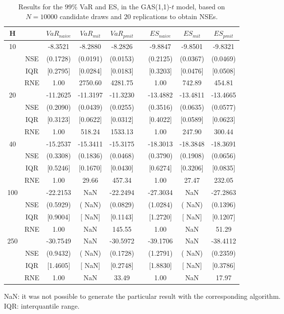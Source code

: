 \begin{table}[h] 
\centering 
\caption{Results for the $99\%$ VaR and ES, in the GAS(1,1)-$t$ model, based on $N=10000$ candidate draws and $20$ replications to obtain NSEs.} 
\label{tab:res_algos_t_gas_ML} 
\begin{tabular}{ccccccccc}  
 H & & $VaR_{naive}$ & $VaR_{mit}$ & $VaR_{pmit}$ &  & $ES_{naive}$ & $ES_{mit}$ & $ES_{pmit}$ \\ \hline 
10 & & -8.3521 & -8.2880 & -8.2826 & & -9.8847 & -9.8501 & -9.8321  \\ 
  & NSE & (0.1728) & (0.0191) & (0.0153) & & (0.2125) & (0.0367) & (0.0469)   \\ 
 & IQR & $[$0.2795$]$ & $[$0.0284$]$ & $[$0.0183$]$ & & $[$0.3203$]$ & $[$0.0476$]$ & $[$0.0508$]$  \\  
  & RNE &   1.00 & 2750.60 & 4281.75 & &   1.00 & 742.89 & 454.81   \\ [1ex] 
20 & & -11.2625 & -11.3197 & -11.3230 & & -13.4882 & -13.4811 & -13.4665  \\ 
  & NSE & (0.2090) & (0.0439) & (0.0255) & & (0.3516) & (0.0635) & (0.0577)   \\ 
 & IQR & $[$0.3123$]$ & $[$0.0622$]$ & $[$0.0312$]$ & & $[$0.4022$]$ & $[$0.0589$]$ & $[$0.0623$]$  \\  
  & RNE &   1.00 & 518.24 & 1533.13 & &   1.00 & 247.90 & 300.44   \\ [1ex] 
40 & & -15.2537 & -15.3411 & -15.3175 & & -18.3013 & -18.3848 & -18.3691  \\ 
  & NSE & (0.3308) & (0.1836) & (0.0468) & & (0.3790) & (0.1908) & (0.0656)   \\ 
 & IQR & $[$0.5246$]$ & $[$0.1670$]$ & $[$0.0430$]$ & & $[$0.6274$]$ & $[$0.3206$]$ & $[$0.0835$]$  \\  
  & RNE &   1.00 &  29.66 & 457.34 & &   1.00 &  27.47 & 232.05   \\ [1ex] 
100 & & -22.2153 &    NaN & -22.2494 & & -27.3034 &    NaN & -27.2863  \\ 
  & NSE & (0.5929) & (   NaN) & (0.0829) & & (1.0284) & (   NaN) & (0.1396)   \\ 
 & IQR & $[$0.9004$]$ & $[$   NaN$]$ & $[$0.1143$]$ & & $[$1.2720$]$ & $[$   NaN$]$ & $[$0.1207$]$  \\  
  & RNE &   1.00 &    NaN & 145.55 & &   1.00 &    NaN &  51.29   \\ [1ex] 
250 & & -30.7549 &    NaN & -30.5972 & & -39.1706 &    NaN & -38.4112  \\ 
  & NSE & (0.9432) & (   NaN) & (0.1728) & & (1.2791) & (   NaN) & (0.2359)   \\ 
 & IQR & $[$1.4605$]$ & $[$   NaN$]$ & $[$0.2748$]$ & & $[$1.8830$]$ & $[$   NaN$]$ & $[$0.3786$]$  \\  
  & RNE &   1.00 &    NaN &  33.49 & &   1.00 &    NaN &  17.97   \\ [1ex] 
\hline 
\end{tabular} 
\raggedright 

\vspace{5pt}\footnotesize{NaN: it was not possible to generate the particular result with the corresponding algorithm.} \\ 
\vspace{5pt}\footnotesize{IQR: interquantile range.} 
\end{table} 
